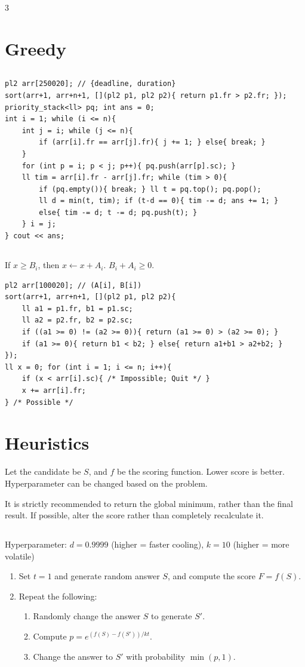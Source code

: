 \documentclass[landscape, 8pt, a4paper, oneside]{extarticle}
\begin{document}
\begin{multicols*}{3}
\section{Greedy}
\subsection{}
\begin{verbatim}
pl2 arr[250020]; // {deadline, duration}
sort(arr+1, arr+n+1, [](pl2 p1, pl2 p2){ return p1.fr > p2.fr; });
priority_stack<ll> pq; int ans = 0;
int i = 1; while (i <= n){
	int j = i; while (j <= n){
		if (arr[i].fr == arr[j].fr){ j += 1; } else{ break; }
	}
	for (int p = i; p < j; p++){ pq.push(arr[p].sc); }
	ll tim = arr[i].fr - arr[j].fr; while (tim > 0){
		if (pq.empty()){ break; } ll t = pq.top(); pq.pop();
		ll d = min(t, tim); if (t-d == 0){ tim -= d; ans += 1; }
		else{ tim -= d; t -= d; pq.push(t); }
	} i = j;
} cout << ans;
\end{verbatim}
\subsection{}
If $x \ge B_i$, then $x \leftarrow x + A_i$. $B_i + A_i \ge 0$.
\begin{verbatim}
pl2 arr[100020]; // (A[i], B[i])
sort(arr+1, arr+n+1, [](pl2 p1, pl2 p2){
	ll a1 = p1.fr, b1 = p1.sc;
	ll a2 = p2.fr, b2 = p2.sc;
	if ((a1 >= 0) != (a2 >= 0)){ return (a1 >= 0) > (a2 >= 0); }
	if (a1 >= 0){ return b1 < b2; } else{ return a1+b1 > a2+b2; }
});
ll x = 0; for (int i = 1; i <= n; i++){
	if (x < arr[i].sc){ /* Impossible; Quit */ }
	x += arr[i].fr;
} /* Possible */
\end{verbatim}
\section{Heuristics}
Let the candidate be $S$, and $f$ be the scoring function. Lower score is better.
Hyperparameter can be changed based on the problem.

It is strictly recommended to return the global minimum, rather than the final result.
If possible, alter the score rather than completely recalculate it.
\subsection{}
Hyperparameter: $d = 0.9999$ (higher = faster cooling), $k = 10$ (higher = more volatile)
\begin{enumerate}
	\item Set $t = 1$ and generate random answer $S$, and compute the score $F = f(S)$.
	\item Repeat the following:
	\begin{enumerate}
		\item Randomly change the answer $S$ to generate $S'$.
		\item Compute $p = e^{(f(S) - f(S'))/kt}$.
		\item Change the answer to $S'$ with probability $\min(p, 1)$.
	\end{enumerate}
\end{enumerate}

\end{multicols*}
\end{document}

